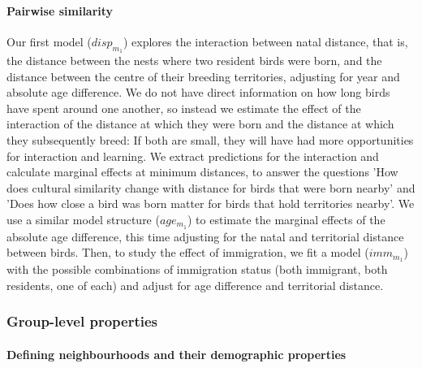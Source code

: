 \documentclass[9pt, twocolumn, twoside]{gsajnl}
\begin{document}
\paragraph{Pairwise similarity}
Our first model ($disp_{m_1}$) explores the interaction between natal distance, that is, the distance between the nests where two resident birds were born, and the distance between the centre of their breeding territories, adjusting for year and absolute age difference. We do not have direct information on how long birds have spent around one another, so instead we estimate the effect of the interaction of the distance at which they were born and the distance at which they subsequently breed: If both are small, they will have had more opportunities for interaction and learning. We extract predictions for the interaction and calculate marginal effects at minimum distances, to answer the questions 'How does cultural similarity change with distance for birds that were born nearby' and 'Does how close a bird was born matter for birds that hold territories nearby'. We use a similar model structure ($age_{m_1}$) to estimate the marginal effects of the absolute age difference, this time adjusting for the natal and territorial distance between birds. Then, to study the effect of immigration, we fit a model ($imm_{m_1}$) with the possible combinations of immigration status (both immigrant, both residents, one of each) and adjust for age difference and territorial distance. 


\subsubsection{Group-level properties}

\paragraph{Defining neighbourhoods and their demographic properties}
\end{document}
